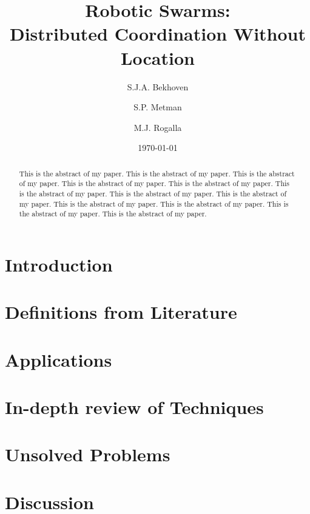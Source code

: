 \documentclass[a4paper]{article}
\title{Robotic Swarms: \\Distributed Coordination Without Location}
\author{S.J.A. Bekhoven  \and
    S.P. Metman \and
    M.J. Rogalla}
\date{\today}
\begin{document}
\maketitle
\thispagestyle{empty}

\begin{abstract}
This is the abstract of my paper.
This is the abstract of my paper.
This is the abstract of my paper.
This is the abstract of my paper.
This is the abstract of my paper.
This is the abstract of my paper.
This is the abstract of my paper.
This is the abstract of my paper.
This is the abstract of my paper.
This is the abstract of my paper.
This is the abstract of my paper.
This is the abstract of my paper.
\end{abstract}


\section{Introduction}
  

\section{Definitions from Literature}
  
  
\section{Applications}
  
 
 \section{In-depth review of Techniques}
  

\section{Unsolved Problems}
  

\section{Discussion}
  




\end{document}
